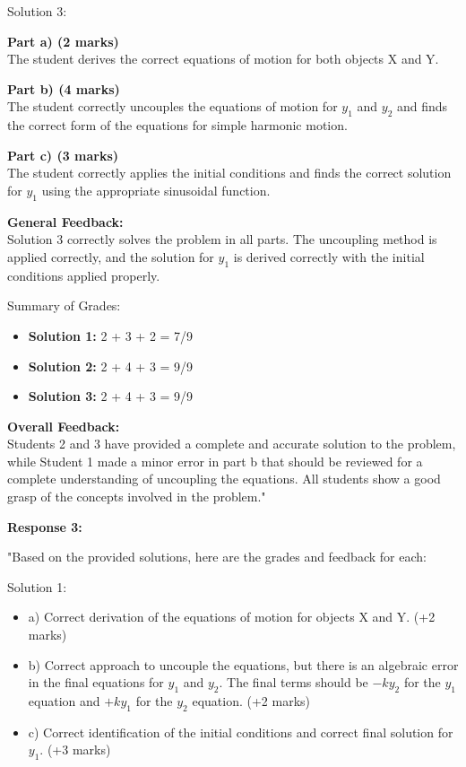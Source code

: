 \documentclass[a4paper,11pt]{article}
\begin{document}
Solution 3:

\textbf{Part a) (2 marks)}\\
The student derives the correct equations of motion for both objects X and Y.

\textbf{Part b) (4 marks)}\\
The student correctly uncouples the equations of motion for \( y_1 \) and \( y_2 \) and finds the correct form of the equations for simple harmonic motion.

\textbf{Part c) (3 marks)}\\
The student correctly applies the initial conditions and finds the correct solution for \( y_1 \) using the appropriate sinusoidal function.

\textbf{General Feedback:}\\
Solution 3 correctly solves the problem in all parts. The uncoupling method is applied correctly, and the solution for \( y_1 \) is derived correctly with the initial conditions applied properly.

Summary of Grades:

\begin{itemize}
  \item \textbf{Solution 1:} 2 + 3 + 2 = 7/9
  \item \textbf{Solution 2:} 2 + 4 + 3 = 9/9
  \item \textbf{Solution 3:} 2 + 4 + 3 = 9/9
\end{itemize}

\textbf{Overall Feedback:}\\
Students 2 and 3 have provided a complete and accurate solution to the problem, while Student 1 made a minor error in part b that should be reviewed for a complete understanding of uncoupling the equations. All students show a good grasp of the concepts involved in the problem."

\textbf{Response 3:}

"Based on the provided solutions, here are the grades and feedback for each:

Solution 1:

\begin{itemize}
    \item a) Correct derivation of the equations of motion for objects X and Y. (+2 marks)
    \item b) Correct approach to uncouple the equations, but there is an algebraic error in the final equations for \( y_1 \) and \( y_2 \). The final terms should be \( -ky_2 \) for the \( y_1 \) equation and \( +ky_1 \) for the \( y_2 \) equation. (+2 marks)
    \item c) Correct identification of the initial conditions and correct final solution for \( y_1 \). (+3 marks)
\end{itemize}
\end{document}
